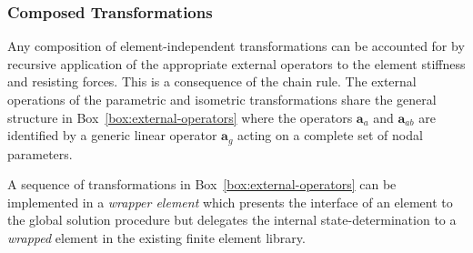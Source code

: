 \hypertarget{sec:chain}{%
\subsubsection{Composed Transformations}}\label{sec:chain}
%
Any composition of element-independent 
transformations can be accounted for by recursive application of the appropriate
external operators to the element stiffness and resisting forces.
%
This is a consequence of the chain rule.
The external operations of the parametric and isometric transformations
share the general structure in Box~\ref{box:external-operators} where the operators \(\mathbf{a}_a\) and \(\mathbf{a}_{ab}\) are identified by a generic linear operator \(\mathbf{a}_g\) acting on a complete set of nodal parameters.


A sequence of transformations %
in Box~\ref{box:external-operators} can be implemented in 
a \emph{wrapper element} which presents the interface of an element to
the global solution procedure but delegates the internal state-determination to a 
\emph{wrapped} element in the existing finite element library. 
%

